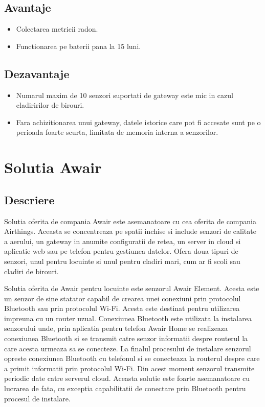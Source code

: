 \subsection{Avantaje}\label{subsec:airthings_avantaje}
\begin{itemize}
	\item Colectarea metricii radon.
	\item Functionarea pe baterii pana la 15 luni.
\end{itemize}

\subsection{Dezavantaje}\label{subsec:airthings_dezavantaje}
\begin{itemize}
	\item Numarul maxim de 10 senzori suportati de gateway este mic in cazul cladiririlor de birouri.
	\item Fara achizitionarea unui gateway, datele istorice care pot fi accesate sunt pe o perioada foarte scurta, limitata de memoria interna a senzorilor.
\end{itemize}

\section{Solutia Awair}\label{sec:awair}
\subsection{Descriere}\label{subsec:awair_descriere}
Solutia oferita de compania Awair este asemanatoare cu cea oferita de compania Airthings. Aceasta se concentreaza pe spatii inchise si include senzori de calitate 
a aerului, un gateway in anumite configuratii de retea, un server in cloud si aplicatie web sau pe telefon pentru gestiunea datelor. Ofera doua tipuri de senzori, 
unul pentru locuinte si unul pentru cladiri mari, cum ar fi scoli sau cladiri de birouri.

Solutia oferita de Awair pentru locuinte este senzorul Awair Element. Acesta este un senzor de sine statator capabil de crearea unei conexiuni prin protocolul 
Bluetooth sau prin protocolul Wi-Fi. Acesta este destinat pentru utilizarea impreuna cu un router uzual. Conexiunea Bluetooth este utilizata la instalarea senzorului 
unde, prin aplicatia pentru telefon Awair Home se realizeaza conexiunea Bluetooth si se transmit catre senzor informatii despre routerul la care acesta urmeaza sa 
se conecteze. La finalul procesului de instalare senzorul opreste conexiunea Bluetooth cu telefonul si se conecteaza la routerul despre care a primit informatii 
prin protocolul Wi-Fi. Din acest moment senzorul transmite periodic date catre serverul cloud. Aceasta solutie este foarte asemanatoare cu lucrarea de fata, cu 
exceptia capabilitatii de conectare prin Bluetooth pentru procesul de instalare.

